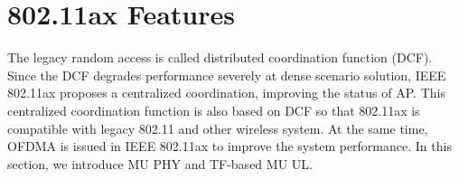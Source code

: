 \documentclass[journal]{IEEEtran}
\begin{document}
%
%


\section{802.11ax Features}			\label{sec_ax_feature}
The legacy random access is called distributed coordination function (DCF). 
Since the DCF degrades performance severely at dense scenario solution, IEEE 802.11ax proposes a centralized coordination, improving the status of AP. 
This centralized coordination function is also based on DCF so that 802.11ax is compatible with legacy 802.11 and other wireless system. 
At the same time, OFDMA is issued in IEEE 802.11ax to improve the system performance. In this section, we introduce MU PHY and TF-based MU UL\cite{dengquality}.
\end{document}
